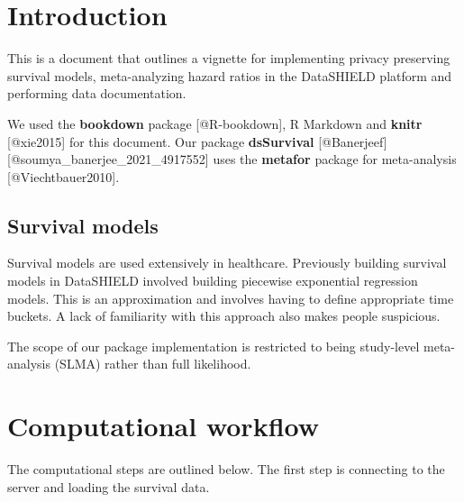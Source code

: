 \documentclass[
]{article}
\author{}
\date{\vspace{-2.5em}}
\begin{document}
\hypertarget{intro}{%
\section{Introduction}\label{intro}}

This is a document that outlines a vignette for implementing privacy
preserving survival models, meta-analyzing hazard ratios in the
DataSHIELD platform and performing data documentation.

We used the \textbf{bookdown} package {[}@R-bookdown{]}, R Markdown and
\textbf{knitr} {[}@xie2015{]} for this document. Our package
\textbf{dsSurvival}
{[}@Banerjeef{]}{[}@soumya\_banerjee\_2021\_4917552{]} uses the
\textbf{metafor} package for meta-analysis {[}@Viechtbauer2010{]}.

\hypertarget{survival-models}{%
\subsection{Survival models}\label{survival-models}}

Survival models are used extensively in healthcare. Previously building
survival models in DataSHIELD involved building piecewise exponential
regression models. This is an approximation and involves having to
define appropriate time buckets. A lack of familiarity with this
approach also makes people suspicious.

The scope of our package implementation is restricted to being
study-level meta-analysis (SLMA) rather than full likelihood.

\hypertarget{computational-workflow}{%
\section{Computational workflow}\label{computational-workflow}}

The computational steps are outlined below. The first step is connecting
to the server and loading the survival data.
\end{document}
